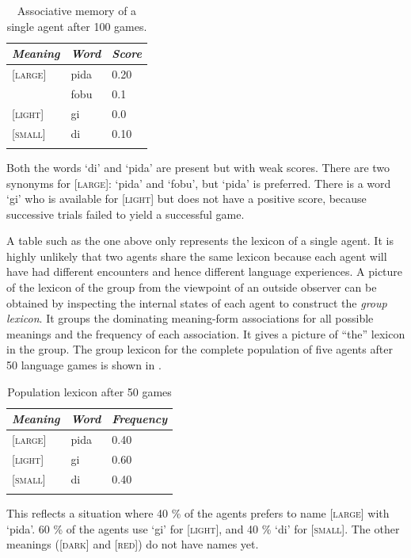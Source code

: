\begin{table}
\begin{center}
\begin{tabular}{l  l  l }
\lsptoprule 
{\itshape Meaning} & {\itshape Word} & {\itshape Score} \\ \midrule
{}[\textsc{large}]& pida& 0.20\\ 
  & fobu& 0.1\\ 
{}[\textsc{light}]& gi& 0.0\\ 
{}[\textsc{small}]& di & 0.10\\ 
\lspbottomrule
\end{tabular}
\caption{\label{tab:t-mem3}Associative memory of a single agent after 100 games.}
\end{center}
\end{table}
Both the words `di' and `pida' are present but with 
weak scores. There are two synonyms for 
{}[\textsc{large}]: `pida' and `fobu', but `pida' is 
preferred. There is a word `gi' who is available 
for [\textsc{light}] but does not have a positive score,
because successive trials failed to yield a successful game. 

A table such as the one above only represents the lexicon
of a single agent. It is highly unlikely that two agents
share the same lexicon because each agent will have 
had different encounters and hence different language
experiences. A picture of the lexicon of the group from the 
viewpoint of an outside observer can be obtained by
inspecting the internal states of each agent to 
construct the {\itshape group lexicon}. It groups the 
dominating meaning-form associations for all possible
meanings and the frequency of each association. 
It gives a picture of ``the'' lexicon 
in the group. The group lexicon
for the complete population of five agents after 50 language games
is shown in . 

\begin{table}
\begin{center}
\begin{tabular}{l  l  l }
\lsptoprule 
{\itshape Meaning}& {\itshape Word} & {\itshape Frequency} \\ \midrule 
{}[\textsc{large}]& pida& 0.40\\ 
{}[\textsc{light}]& gi & 0.60\\ 
{}[\textsc{small}]& di & 0.40\\ 
\lspbottomrule
\end{tabular}
\caption{\label{tab:t-mem4}Population lexicon after 50 games}
\end{center}
\end{table}
This reflects a situation where 40 \%
of the agents prefers to name [\textsc{large}] with
`pida'. 60 \% of the agents
use `gi' for [\textsc{light}], and 40 \% `di' for [\textsc{small}]. 
The other meanings ([\textsc{dark}] and [\textsc{red}]) do not have names yet. 

